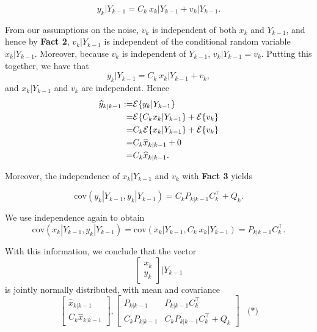\documentclass[letterpaper]{article}
\newcommand{\cov}{\mathrm{cov}}
\newcommand{\Expectof}[1]{{\cal E} \{ #1 \}}
\begin{document}
$$y_k|Y_{k-1} = C_k ~x_k|Y_{k-1} + v_k|Y_{k-1}.$$


From our assumptions on the noise, $v_k$ is independent of both $x_k$ and $Y_{k-1}$, and hence by \textbf{Fact 2}, $v_k|Y_{k-1}$ is independent of the conditional random variable $x_k|Y_{k-1}$. Moreover, because $v_k$ is independent of $Y_{k-1}$,  $v_k|Y_{k-1} =v_k$. Putting this together, we have that
$$y_k|Y_{k-1} = C_k ~x_k|Y_{k-1} + v_k,$$
and $x_k|Y_{k-1}$ and $v_k$ are independent. Hence
\begin{align*}
\widehat{y}_{k|k-1}:=& \Expectof{y_k|Y_{k-1}} \\
=& \Expectof{C_k x_k|Y_{k-1}} + \Expectof{v_k} \\
=& C_k\Expectof{ x_k|Y_{k-1}} + \Expectof{v_k} \\
=&C_k \widehat{x}_{k|k-1} + 0\\
=&C_k \widehat{x}_{k|k-1}.
\end{align*}

Moreover, the independence of $x_k|Y_{k-1}$ and $v_k$ with \textbf{Fact 3} yields

$$ \cov(y_k|Y_{k-1}, y_k|Y_{k-1}) = C_k P_{k|k-1} C_k^\top  + Q_k.$$

We use independence again to obtain
$$\cov(x_k|Y_{k-1},y_k |Y_{k-1}) = \cov(x_k|Y_{k-1},C_k ~x_k|Y_{k-1})=P_{k|k-1} C_k^\top.$$

%
\newpage

With this information, we conclude that  the vector
$$ \left[ \begin{array}{c} x_k\\y_k \end{array} \right] | Y_{k-1}$$
is jointly normally distributed, with mean and covariance
$$\left[ \begin{array}{r} \widehat{x}_{k|k-1} \\ C_k  \widehat{x}_{k|k-1} \end{array} \right], \left[ \begin{array}{cc}  P_{k|k-1} &  P_{k|k-1} C_k^\top\\ C_k  P_{k|k-1} & C_k P_{k|k-1} C_k^\top  + Q_k \end{array} \right] ~~~~\textbf{(*)}$$
\end{document}
